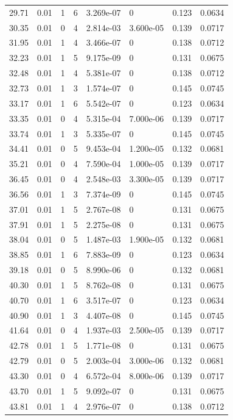 \documentclass[preview]{standalone}
\begin{document}
{{{\begin{tabular}{L{1.2cm}C{1.2cm} C{0.3cm}C{0.5cm} C{1.4cm}C{1.4cm} C{1.4cm}C{1.4cm}}
  29.71  &  0.01  & 1     &  6 &  3.269e-07  & 0  & 0.123 &  0.0634   \\ 
  30.35  &  0.01  & 0     &  4 &  2.814e-03  & 3.600e-05  & 0.139 &  0.0717   \\ 
  31.95  &  0.01  & 1     &  4 &  3.466e-07  & 0  & 0.138 &  0.0712   \\ 
  32.23  &  0.01  & 1     &  5 &  9.175e-09  & 0  & 0.131 &  0.0675   \\ 
  32.48  &  0.01  & 1     &  4 &  5.381e-07  & 0  & 0.138 &  0.0712   \\ 
  32.73  &  0.01  & 1     &  3 &  1.574e-07  & 0  & 0.145 &  0.0745   \\ 
  33.17  &  0.01  & 1     &  6 &  5.542e-07  & 0  & 0.123 &  0.0634   \\ 
  33.35  &  0.01  & 0     &  4 &  5.315e-04  & 7.000e-06  & 0.139 &  0.0717   \\ 
  33.74  &  0.01  & 1     &  3 &  5.335e-07  & 0  & 0.145 &  0.0745   \\ 
  34.41  &  0.01  & 0     &  5 &  9.453e-04  & 1.200e-05  & 0.132 &  0.0681   \\ 
  35.21  &  0.01  & 0     &  4 &  7.590e-04  & 1.000e-05  & 0.139 &  0.0717   \\ 
  36.45  &  0.01  & 0     &  4 &  2.548e-03  & 3.300e-05  & 0.139 &  0.0717   \\ 
  36.56  &  0.01  & 1     &  3 &  7.374e-09  & 0  & 0.145 &  0.0745   \\ 
  37.01  &  0.01  & 1     &  5 &  2.767e-08  & 0  & 0.131 &  0.0675   \\ 
  37.91  &  0.01  & 1     &  5 &  2.275e-08  & 0  & 0.131 &  0.0675   \\ 
  38.04  &  0.01  & 0     &  5 &  1.487e-03  & 1.900e-05  & 0.132 &  0.0681   \\ 
  38.85  &  0.01  & 1     &  6 &  7.883e-09  & 0  & 0.123 &  0.0634   \\ 
  39.18  &  0.01  & 0     &  5 &  8.990e-06  & 0  & 0.132 &  0.0681   \\ 
  40.30  &  0.01  & 1     &  5 &  8.762e-08  & 0  & 0.131 &  0.0675   \\ 
  40.70  &  0.01  & 1     &  6 &  3.517e-07  & 0  & 0.123 &  0.0634   \\ 
  40.90  &  0.01  & 1     &  3 &  4.407e-08  & 0  & 0.145 &  0.0745   \\ 
  41.64  &  0.01  & 0     &  4 &  1.937e-03  & 2.500e-05  & 0.139 &  0.0717   \\ 
  42.78  &  0.01  & 1     &  5 &  1.771e-08  & 0  & 0.131 &  0.0675   \\ 
  42.79  &  0.01  & 0     &  5 &  2.003e-04  & 3.000e-06  & 0.132 &  0.0681   \\ 
  43.30  &  0.01  & 0     &  4 &  6.572e-04  & 8.000e-06  & 0.139 &  0.0717   \\ 
  43.70  &  0.01  & 1     &  5 &  9.092e-07  & 0  & 0.131 &  0.0675   \\ 
  43.81  &  0.01  & 1     &  4 &  2.976e-07  & 0  & 0.138 &  0.0712   \\ 
\hline 
\end{tabular} 

}}}
\end{document}
